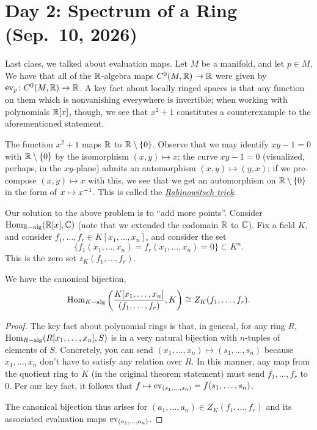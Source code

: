 \section{Day 2: Spectrum of a Ring (Sep.\ 10, 2026)}
Last class, we talked about evaluation maps. Let $M$ be a manifold, and let $p \in M$. We have that all of the $\mathbb R$-algebra maps $C^0(M, \mathbb R) \to \mathbb R$ were given by $\operatorname{ev}_p \colon C^0(M, \mathbb R) \to \mathbb R$. A key fact about locally ringed spaces is that any function on them which is nonvanishing everywhere is invertible; when working with polynomials $\mathbb R[x]$, though, we see that $x^2 + 1$ constitutes a counterexample to the aforementioned statement.

The function $x^2 + 1$ maps $\mathbb R$ to $\mathbb R \setminus \{0\}$. Observe that we may identify $xy - 1 = 0$ with $\mathbb R \setminus \{0\}$ by the isomorphism $(x, y) \mapsto x$; the curve $xy - 1 = 0$ (visualized, perhaps, in the $xy$-plane) admits an automorphism $(x, y) \mapsto (y, x)$; if we pre-compose $(x, y) \mapsto x$ with this, we see that we get an automorphism on $\mathbb R \setminus \{0\}$ in the form of $x \mapsto x^{-1}$. This is called the \href{https://en.wikipedia.org/wiki/Rabinowitsch_trick}{\textit{Rabinowitsch trick}}.

Our solution to the above problem is to ``add more points''. Consider $\operatorname{Hom}_{\mathbb R-\operatorname{alg}}(\mathbb R[x], \mathbb C)$ (note that we extended the codomain $\mathbb R$ to $\mathbb C$). %
Fix a field $K$, and consider $f_1, \dots, f_r \in K[x_1, \dots, x_n]$, and consider the set
\[ \{f_1(x_1, \dots, x_n) = f_r(x_1, \dots, x_n) = 0\} \subset K^n. \]
This is the zero set $z_K(f_1, \dots, f_r)$.
\begin{theorem} \label{thm:canonical_bijection_zero_set}
    We have the canonical bijection,
    \[ \operatorname{Hom}_{K-\operatorname{alg}}\left(\frac{K[x_1, \dots, x_n]}{(f_1, \dots, f_r)}, K\right) \cong Z_K(f_1, \dots, f_r). \]
\end{theorem} \vspace{-8pt}
\begin{proof}
    The key fact about polynomial rings is that, in general, for any ring $R$, $\operatorname{Hom}_{R-\operatorname{alg}}(R[x_1, \dots, x_n], S)$ is in a very natural bijection with $n$-tuples of elements of $S$. Concretely, you can send $(x_1, \dots, x_n) \mapsto (s_1, \dots, s_n)$ because $x_1, \dots, x_n$ don't have to satisfy any relation over $R$. In this manner, any map from the quotient ring to $K$ (in the original theorem statement) must send $f_1, \dots, f_r$ to $0$. Per our key fact, it follows that $f \mapsto \operatorname{ev}_{(s_1, \dots, s_n)} = f(s_1, \dots, s_n)$.

    The canonical bijection thus arises for $(a_1, \dots, a_n) \in Z_K(f_1, \dots, f_r)$ and its associated evaluation maps $\operatorname{ev}_{(a_1, \dots, a_n)}$.
\end{proof}

